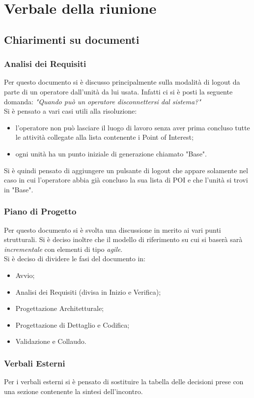 \section{Verbale della riunione}
\subsection{Chiarimenti su documenti}
\subsubsection{Analisi dei Requisiti}
Per questo documento si è discusso principalmente sulla modalità di logout da parte di un operatore dall'unità da lui usata. Infatti ci si è posti la seguente domanda: \textit{"Quando può un operatore disconnettersi dal sistema?"}\\
Si è pensato a vari casi utili alla risoluzione:
\begin{itemize}
	\item l'operatore non può lasciare il luogo di lavoro senza aver prima concluso tutte le attività collegate alla lista contenente i Point of Interest;
	\item ogni unità ha un punto iniziale di generazione chiamato "Base".
\end{itemize}
Si è quindi pensato di aggiungere un pulsante di logout che appare solamente nel caso in cui l'operatore abbia già concluso la sua lista di POI e che l'unità si trovi in "Base".

\subsubsection{Piano di Progetto}
Per questo documento si è svolta una discussione in merito ai vari punti strutturali. Si è deciso inoltre che il modello di riferimento su cui si baserà sarà \textit{incrementale} con elementi di tipo \textit{agile}.\\
Si è deciso di dividere le fasi del documento in:
\begin{itemize}
	\item Avvio;
	\item Analisi dei Requisiti (divisa in Inizio e Verifica);
	\item Progettazione Architetturale;
	\item Progettazione di Dettaglio e Codifica;
	\item Validazione e Collaudo.
\end{itemize}

\subsubsection{Verbali Esterni}
Per i verbali esterni si è pensato di sostituire la tabella delle decisioni prese con una sezione contenente la sintesi dell'incontro.


